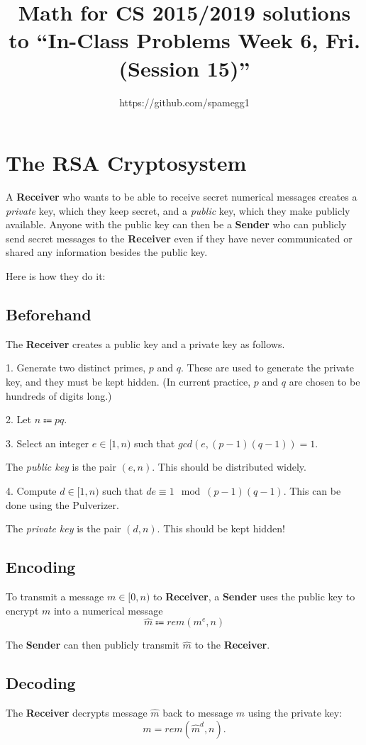 \documentclass[14pt]{extarticle}
\title{Math for CS 2015/2019 solutions to ``In-Class Problems Week 6, Fri. (Session 15)''}
\author{https://github.com/spamegg1}
\begin{document}
\maketitle
\tableofcontents

\section{The RSA Cryptosystem}
A {\bf Receiver} who wants to be able to receive secret numerical messages creates a {\it private} key, which they keep secret, and a {\it public} key, which they make publicly available. Anyone with the public key can then be a {\bf Sender} who can publicly send secret messages to the {\bf Receiver} even if they have never communicated or shared any information besides the public key.

Here is how they do it:

\subsection{Beforehand} 
The {\bf Receiver} creates a public key and a private key as follows.

1. Generate two distinct primes, $p$ and $q$. These are used to generate the private key, and they must be kept hidden. (In current practice, $p$ and $q$ are chosen to be hundreds of digits long.)

2. Let $n \Coloneqq pq$.

3. Select an integer $e \in[1, n)$ such that $gcd(e, (p - 1)(q - 1)) = 1$.

The {\it public key} is the pair $(e, n)$. This should be distributed widely.

4. Compute $d \in [1, n)$ such that $de \equiv 1 \mod (p - 1)(q - 1)$. This can be done using the Pulverizer.

The {\it private key} is the pair $(d, n)$. This should be kept hidden!

\subsection{Encoding} 
To transmit a message $m \in [0, n)$ to {\bf Receiver}, a {\bf Sender} uses the public key to encrypt $m$ into a numerical message
$$
\hat{m} \Coloneqq rem(m^e, n)
$$

The {\bf Sender} can then publicly transmit $\hat{m}$ to the {\bf Receiver}.

\subsection{Decoding} 
The {\bf Receiver} decrypts message $\hat{m}$ back to message $m$ using the private key:
$$
m = rem(\hat{m}^d, n).
$$
\end{document}
